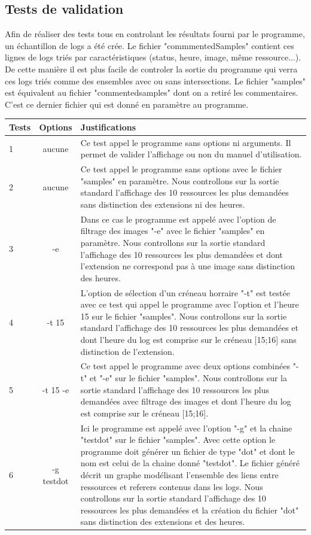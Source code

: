 \documentclass[a4paper]{article}
\begin{document}
\begin{appendix}
\section{Tests de validation}\noindent
Afin de réaliser des tests tous en controlant les résultats fourni par le programme, un échantillon de logs a été crée.
Le fichier "commmentedSamples" contient ces lignes de logs triés par caractéristiques (status, heure, image, même ressource...). De cette manière il est plus facile de controler la sortie du programme qui verra ces logs triés comme des ensembles avec ou sans intersections.
Le fichier "samples" est équivalent au fichier "commentedsamples" dont on a retiré les commentaires. C'est ce dernier fichier qui est donné en paramètre au programme.
\bigskip

\begin{tabular}{|l|c|m{10cm}|}
\hline
\bf Tests & \bf Options & \bf Justifications\\
\hline
1		 & aucune 	    & Ce test appel le programme sans options ni arguments. Il permet de valider l'affichage ou non du manuel d'utilisation.\\
\hline
2		 & aucune		& Ce test appel le programme sans options avec le fichier "samples" en paramètre. Nous controllons sur la sortie standard l'affichage 							  des 10 ressources les plus demandées sans distinction des extensions ni des heures. \\
\hline
3		 & -e 			& Dans ce cas le programme est appelé avec l'option de filtrage des images "-e" avec le fichier "samples" en paramètre. Nous 									  controllons sur la sortie standard l'affichage des 10 ressources les plus demandées et dont l'extension ne correspond pas à une image 						  sans distinction des heures. \\
\hline
4		& -t 15			& L'option de sélection d'un créneau horraire "-t" est testée avec ce test qui appel le programme avec l'option et l'heure 15 sur le 							  fichier "samples". Nous controllons sur la sortie standard l'affichage des 10 ressources les plus demandées et dont l'heure du log 							  est comprise sur le créneau [15;16] sans distinction de l'extension. \\
\hline
5		& -t 15 -e		& Ce test appel le programme avec deux options combinées "-t" et "-e" sur le fichier "samples". Nous controllons sur la sortie standard 						  l'affichage des 10 ressources les plus demandées avec filtrage des images et dont l'heure du log est comprise sur le créneau [15;16]. 						  \\
\hline
6		& -g testdot		& Ici le programme est appelé avec l'option "-g" et la chaine "testdot" sur le fichier "samples". Avec cette option le programme doit 							  générer un fichier de type "dot" et dont le nom est celui de la chaine donné "testdot". Le fichier généré décrit un graphe modélisant 						  l'ensemble des liens entre ressources et referers contenus dans les logs. Nous controllons sur la sortie standard l'affichage des 10 							  ressources les plus demandées et la création du fichier "dot" sans distinction des extensions et des heures.\\
\hline

\end{tabular}
\end{appendix}
\end{document}
